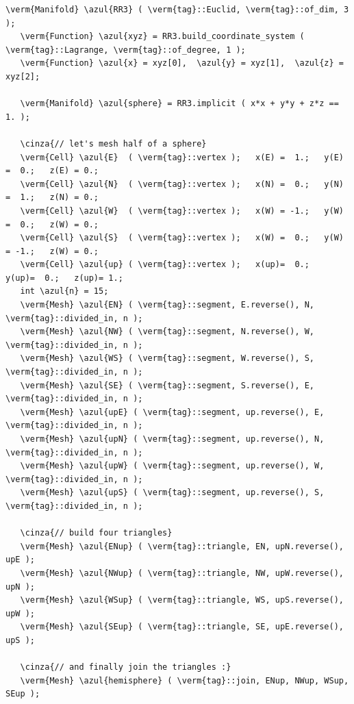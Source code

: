 \begin{Verbatim}[commandchars=\\\{\},formatcom=\small\tt,frame=single,
   label=main-\ref{\numb section 2.\numb parag 5}.cpp,rulecolor=\color{coment},
   baselinestretch=0.94,framesep=2mm]
   \verm{Manifold} \azul{RR3} ( \verm{tag}::Euclid, \verm{tag}::of_dim, 3 );
   \verm{Function} \azul{xyz} = RR3.build_coordinate_system ( \verm{tag}::Lagrange, \verm{tag}::of_degree, 1 );
   \verm{Function} \azul{x} = xyz[0],  \azul{y} = xyz[1],  \azul{z} = xyz[2];

   \verm{Manifold} \azul{sphere} = RR3.implicit ( x*x + y*y + z*z == 1. );

   \cinza{// let's mesh half of a sphere}
   \verm{Cell} \azul{E}  ( \verm{tag}::vertex );   x(E) =  1.;   y(E) =  0.;   z(E) = 0.;
   \verm{Cell} \azul{N}  ( \verm{tag}::vertex );   x(N) =  0.;   y(N) =  1.;   z(N) = 0.;
   \verm{Cell} \azul{W}  ( \verm{tag}::vertex );   x(W) = -1.;   y(W) =  0.;   z(W) = 0.;
   \verm{Cell} \azul{S}  ( \verm{tag}::vertex );   x(W) =  0.;   y(W) = -1.;   z(W) = 0.;
   \verm{Cell} \azul{up} ( \verm{tag}::vertex );   x(up)=  0.;   y(up)=  0.;   z(up)= 1.;
   int \azul{n} = 15;
   \verm{Mesh} \azul{EN} ( \verm{tag}::segment, E.reverse(), N, \verm{tag}::divided_in, n );
   \verm{Mesh} \azul{NW} ( \verm{tag}::segment, N.reverse(), W, \verm{tag}::divided_in, n );
   \verm{Mesh} \azul{WS} ( \verm{tag}::segment, W.reverse(), S, \verm{tag}::divided_in, n );
   \verm{Mesh} \azul{SE} ( \verm{tag}::segment, S.reverse(), E, \verm{tag}::divided_in, n );
   \verm{Mesh} \azul{upE} ( \verm{tag}::segment, up.reverse(), E, \verm{tag}::divided_in, n );
   \verm{Mesh} \azul{upN} ( \verm{tag}::segment, up.reverse(), N, \verm{tag}::divided_in, n );
   \verm{Mesh} \azul{upW} ( \verm{tag}::segment, up.reverse(), W, \verm{tag}::divided_in, n );
   \verm{Mesh} \azul{upS} ( \verm{tag}::segment, up.reverse(), S, \verm{tag}::divided_in, n );

   \cinza{// build four triangles}
   \verm{Mesh} \azul{ENup} ( \verm{tag}::triangle, EN, upN.reverse(), upE );
   \verm{Mesh} \azul{NWup} ( \verm{tag}::triangle, NW, upW.reverse(), upN );
   \verm{Mesh} \azul{WSup} ( \verm{tag}::triangle, WS, upS.reverse(), upW );
   \verm{Mesh} \azul{SEup} ( \verm{tag}::triangle, SE, upE.reverse(), upS );

   \cinza{// and finally join the triangles :}
   \verm{Mesh} \azul{hemisphere} ( \verm{tag}::join, ENup, NWup, WSup, SEup );
\end{Verbatim}

